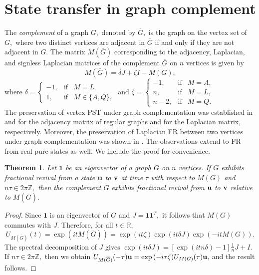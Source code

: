 \documentclass[12pt,a4paper]{article}
\newtheorem{thm}{Theorem}
\def \u {{\bf u}}
\def \v {{\bf v}}
\begin{document}
\section{State transfer in graph complement}\label{5sec2}
The \emph{complement} of a graph $G,$ denoted by $\overline{G},$ is the graph on the vertex set of $G,$ where two distinct vertices are adjacent in $\overline {G}$ if and only if they are not adjacent in $G.$ 
The matrix $M(\overline{G})$ corresponding to the adjacency, Laplacian, and signless Laplacian matrices of the complement $\overline{G}$ on $n$ vertices is given by
\[M(\overline{G})=\delta J+\zeta I-M(G),\]
   where $\delta=\left\{ \begin{array}{rcl}
 -1, & \mbox{if} & M =L \\ 
 1, & \mbox{if} & M \in\{A,Q\},
 \end{array}\right.$
\quad and \quad
$\zeta=\left\{ \begin{array}{rcl}
 -1, & \mbox{if} & M=A, \\ 
n, & \mbox{if} & M=L, \\
n-2, & \mbox{if} & M=Q. 
 \end{array}\right.$
\\The preservation of vertex PST under graph complementation was established in \cite[Lemma 15.3]{god1} and \cite[Theorem 2]{alv} for the adjacency matrix of regular graphs and for the Laplacian matrix, respectively. Moreover, the preservation of Laplacian FR between two vertices under graph complementation was shown in \cite[Theorem 9]{chan3}. The observations extend to FR from real pure states as well. We include the proof for convenience.
 \begin{thm}\label{5t15}
 Let $\mathbf{1}$ be an eigenvector of a graph $G$ on $n$ vertices. If $G$ exhibits fractional revival from a state $\u$ to $\v$ at time $\tau$ with respect to $M(G)$ and $n\tau\in 2\pi\mathbb{Z},$ then the complement $\overline G$ exhibits fractional revival from $\u$ to $\v$ relative to $M(\overline{G}).$ 
 \end{thm}
\begin{proof}
   Since $\mathbf{1}$ is an eigenvector of $G$ and $J=\mathbf{1}\mathbf{1}^T,$ it follows that $M(G)$ commutes with $J.$ Therefore, for all $t\in\mathbb{R},$
   \[U_{M(\overline{G})}(t)=\exp{(itM(\overline{G}))=\exp{(i t\zeta)}\exp{(it\delta J)}}\exp{(-itM(G))}.\]
    The spectral decomposition of $J$ gives
   $\exp{(it\delta J)}=[\exp{(itn\delta)}-1]\frac{1}{n}J+I.$ 
   If $n\tau\in 2\pi \mathbb{Z},$ then we obtain $U_{M(\overline{G})}(-\tau)\u=\exp{(-i\tau\zeta)} U_{M(G)}(\tau)\u,$ and the result follows.
\end{proof}
\end{document}
